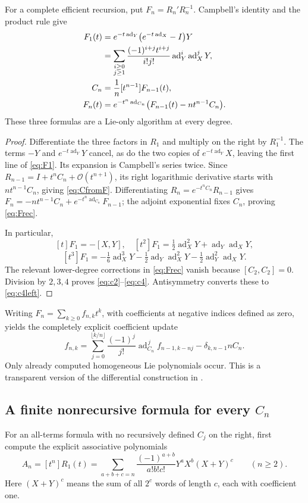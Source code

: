 \documentclass[11pt]{article}
\theoremstyle{definition}
\theoremstyle{remark}
\newcommand{\ad}{\operatorname{ad}}
\newcommand{\smallO}{\mathcal O}
\numberwithin{equation}{section}
\begin{document}
For a complete efficient recursion, put $F_n=R_n'R_n^{-1}$. Campbell's identity and the product rule give
\begin{align}
 F_1(t)&=e^{-t\ad_Y}\bigl(e^{-t\ad_X}-I\bigr)Y\notag\\
 &=\sum_{\substack{i\geq0\\j\geq1}}
        \frac{(-1)^{i+j}t^{i+j}}{i!j!}\ad_Y^i\ad_X^jY,\label{eq:F1}\\
 C_n&=\frac1n[t^{n-1}]F_{n-1}(t),\label{eq:CfromF}\\
 F_n(t)&=e^{-t^n\ad_{C_n}}
                     \bigl(F_{n-1}(t)-nt^{n-1}C_n\bigr).\label{eq:Frec}
\end{align}
These three formulas are a Lie-only algorithm at every degree.
\begin{proof}
Differentiate the three factors in $R_1$ and multiply on the right by $R_1^{-1}$. The terms $-Y$ and $e^{-t\ad_Y}Y$ cancel, as do the two copies of $e^{-t\ad_Y}X$, leaving the first line of \eqref{eq:F1}. Its expansion is Campbell's series twice. Since $R_{n-1}=I+t^nC_n+\smallO(t^{n+1})$, its right logarithmic derivative starts with $nt^{n-1}C_n$, giving \eqref{eq:CfromF}. Differentiating $R_n=e^{-t^nC_n}R_{n-1}$ gives
$F_n=-nt^{n-1}C_n+e^{-t^n\ad_{C_n}}F_{n-1}$; the adjoint exponential fixes $C_n$, proving \eqref{eq:Frec}.

In particular,
\[
 [t]F_1=-[X,Y],\quad
 [t^2]F_1=\tfrac12\ad_X^2Y+\ad_Y\ad_XY,
\]
\[
 [t^3]F_1=-\tfrac16\ad_X^3Y-\tfrac12\ad_Y\ad_X^2Y
                         -\tfrac12\ad_Y^2\ad_XY.
\]
The relevant lower-degree corrections in \eqref{eq:Frec} vanish because $[C_2,C_2]=0$. Division by $2,3,4$ proves \eqref{eq:c2}--\eqref{eq:c4}. Antisymmetry converts these to \eqref{eq:c4left}.
\end{proof}
Writing $F_n=\sum_{k\geq0}f_{n,k}t^k$, with coefficients at negative indices defined as zero, yields the completely explicit coefficient update
\begin{equation}\label{eq:frec}
 f_{n,k}=\sum_{j=0}^{\lfloor k/n\rfloor}
              \frac{(-1)^j}{j!}\ad_{C_n}^{\,j}f_{n-1,k-nj}
              -\delta_{k,n-1}nC_n.
\end{equation}
Only already computed homogeneous Lie polynomials occur. This is a transparent version of the differential construction in \cite{casas}.

\subsection{A finite nonrecursive formula for every \texorpdfstring{$C_n$}{Cn}}
For an all-terms formula with no recursively defined $C_j$ on the right, first compute the explicit associative polynomials
\begin{equation}\label{eq:rawRn}
 A_n=[t^n]R_1(t)=
 \sum_{a+b+c=n}\frac{(-1)^{a+b}}{a!b!c!}Y^aX^b(X+Y)^c
 \qquad(n\geq2).
\end{equation}
Here $(X+Y)^c$ means the sum of all $2^c$ words of length $c$, each with coefficient one.
\end{document}
